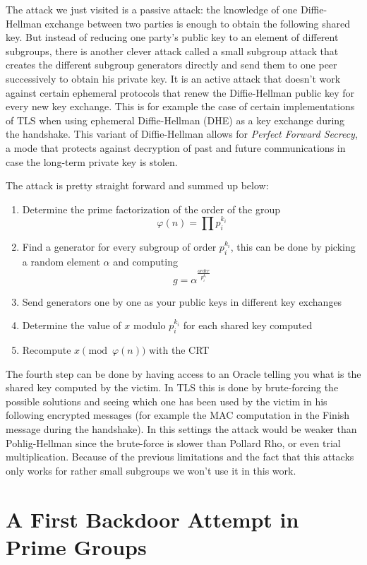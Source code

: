 \documentclass[a4paper,11pt,twocolumn]{article}
\begin{document}
The attack we just visited is a passive attack: the knowledge of one Diffie-Hellman exchange between two parties is enough to obtain the following shared key. But instead of reducing one party's public key to an element of different subgroups, there is another clever attack called a small subgroup attack that creates the different subgroup generators directly and send them to one peer successively to obtain his private key. It is an active attack that doesn't work against certain ephemeral protocols that renew the Diffie-Hellman public key for every new key exchange. This is for example the case of certain implementations of TLS when using ephemeral Diffie-Hellman (DHE) as a key exchange during the handshake. This variant of Diffie-Hellman allows for \emph{Perfect Forward Secrecy}, a mode that protects against decryption of past and future communications in case the long-term private key is stolen.

The attack is pretty straight forward and summed up below:

\begin{enumerate}
    \item Determine the prime factorization of the order of the group
      $$\varphi(n) = \prod p_i^{k_i} $$
    \item Find a generator for every subgroup of order $p_i^{k_i}$, this can be done by picking a random element $\alpha$ and computing
      $$g = \alpha^{\frac{order}{p_i^{k_i}}}$$
    \item Send generators one by one as your public keys in different key exchanges
    \item Determine the value of $x$ modulo $p_i^{k_i}$ for each shared key computed
    \item Recompute $x \pmod{\varphi(n)}$ with the CRT
\end{enumerate}

The fourth step can be done by having access to an Oracle telling you what is the shared key computed by the victim. In TLS this is done by brute-forcing the possible solutions and seeing which one has been used by the victim in his following encrypted messages (for example the MAC computation in the Finish message during the handshake). In this settings the attack would be weaker than Pohlig-Hellman since the brute-force is slower than Pollard Rho, or even trial multiplication. Because of the previous limitations and the fact that this attacks only works for rather small subgroups we won't use it in this work.

\section{A First Backdoor Attempt in Prime Groups}
\end{document}
